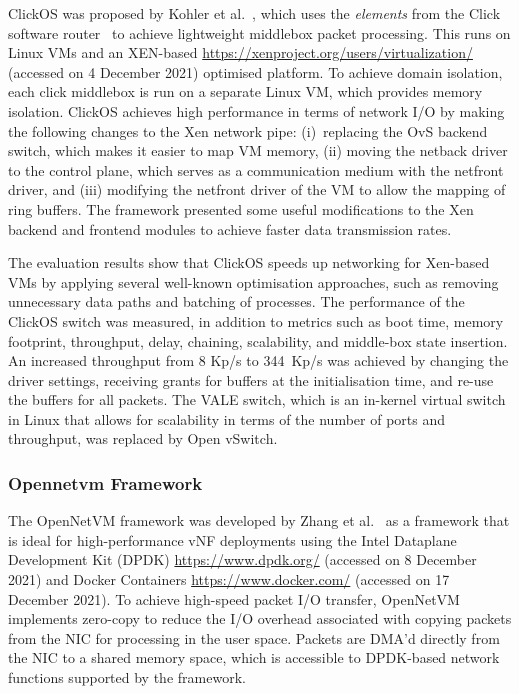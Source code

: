 \documentclass[futureinternet,review,accept,pdftex,moreauthors]{Definitions/mdpi}
\begin{document}
ClickOS was proposed by Kohler {et al.}~\cite{martins2014clickos}, which uses the \textit{elements} from the Click software router~\cite{kohler2000click} to achieve lightweight middlebox packet processing. This runs on Linux VMs and an XEN-based {\url{https://xenproject.org/users/virtualization/}} ({accessed} %
on 4 December 2021) optimised platform. To achieve domain isolation, each click middlebox is run on a separate Linux VM, which provides memory isolation. ClickOS achieves high performance in terms of network I/O by making the following changes to the Xen network pipe: (i)~replacing the OvS backend switch, which makes it easier to map VM memory, (ii) moving the netback driver to the control plane, which serves as a communication medium with the netfront driver, and (iii) modifying the netfront driver of the VM to allow the mapping of ring buffers. The framework presented some useful modifications to the Xen backend and frontend modules to achieve faster data transmission rates. 

The evaluation results show that ClickOS speeds up networking for Xen-based VMs by applying several well-known optimisation approaches, such as removing unnecessary data paths and batching of processes. The performance of the ClickOS switch was measured, in addition to metrics such as boot time, memory footprint, throughput, delay, chaining, scalability, and middle-box state insertion. An increased throughput from 8 Kp/s to 344~Kp/s was achieved by changing the driver settings, receiving grants for buffers at the initialisation time, and re-use the buffers for all packets. The VALE switch, which is an in-kernel virtual switch in Linux that allows for scalability in terms of the number of ports and throughput, was replaced by Open vSwitch. 



\subsubsection{Opennetvm Framework}
\label{OpenNetVM}

The OpenNetVM framework was developed by Zhang {et al.}~\cite{zhang2016opennetvm} as a framework that is ideal for high-performance vNF deployments using the Intel Dataplane Development Kit (DPDK) {\url{https://www.dpdk.org/}} ({accessed} %
  on 8 December 2021) and Docker Containers {\url{https://www.docker.com/}} ({accessed} %
on 17 December 2021). To achieve high-speed packet I/O transfer, OpenNetVM implements zero-copy to reduce the I/O overhead associated with copying packets from the NIC for processing in the user space. Packets are DMA'd directly from the NIC to a shared memory space, which is accessible to DPDK-based network functions supported by the framework.
\end{document}
